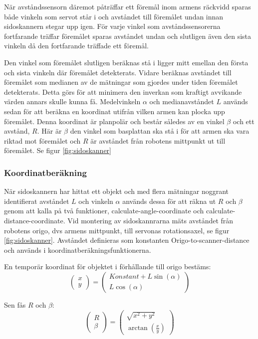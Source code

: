 När avståndssensorn däremot påträffar ett föremål inom armens räckvidd sparas både vinkeln som servot står i och avståndet till föremålet undan innan sidoskannern stegar upp igen. För varje vinkel som avståndssensorerna fortfarande träffar föremålet sparas avståndet undan och slutligen även den sista vinkeln då den fortfarande träffade ett föremål.

Den vinkel som föremålet slutligen beräknas stå i ligger mitt emellan den första och sista vinkeln där föremålet detekterats. Vidare beräknas avståndet till föremålet som medianen av de mätningar som gjordes under tiden föremålet detekterats. Detta görs för att minimera den inverkan som kraftigt avvikande värden annars skulle kunna få. Medelvinkeln $\alpha$ och medianavståndet $L$ används sedan för att beräkna en koordinat utifrån vilken armen kan plocka upp föremålet. Denna koordinat är planpolär och består således av en vinkel $\beta$ och ett avstånd, $R$. Här är $\beta$ den vinkel som basplattan ska stå i för att armen ska vara riktad mot föremålet och $R$ är avståndet från robotens mittpunkt ut till föremålet. Se figur \ref{fig:sidoskanner}


\subsubsection{Koordinatberäkning}
När sidoskannern har hittat ett objekt och med flera mätningar noggrant identifierat avståndet $L$ och vinkeln $\alpha$ används dessa för att räkna ut $R$ och $\beta$ genom att kalla på två funktioner, calculate-angle-coordinate och calculate-distance-coordinate.
Vid montering av sidoskannrarna mäts avståndet från robotens origo, dvs armens mittpunkt, till servonas rotationsaxel, se figur \ref{fig:sidoskanner}. Avståndet definieras som konstanten Origo-to-scanner-distance och används i koordinatberäkningsfunktionerna.

En temporär koordinat för objektet i förhållande till origo bestäms:
$$\begin{pmatrix}
x \\ y
\end{pmatrix}
 = 
\begin{pmatrix}
Konstant+L \sin(\alpha) \\ 
L \cos(\alpha)
\end{pmatrix}$$

Sen fås $R$ och $\beta$:
$$\begin{pmatrix}
R \\ \beta
\end{pmatrix}
 = 
\begin{pmatrix}
\sqrt{x^2 + y^2} \\ 
\arctan(\frac{x}{y})
\end{pmatrix}$$

